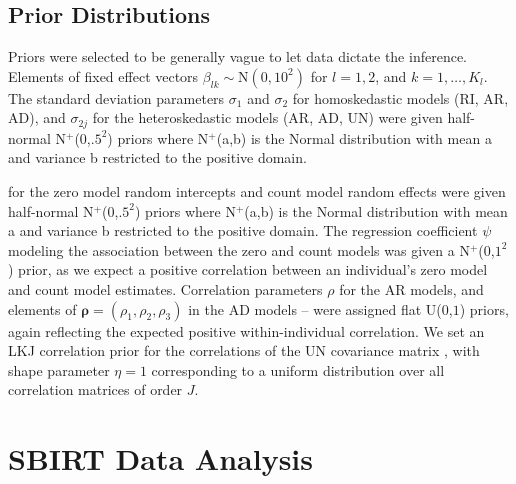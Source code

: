 \documentclass[12pt]{article}
\begin{document}
\subsection{Prior Distributions}

Priors were selected to be generally vague to let data dictate the inference. Elements of fixed effect vectors $\beta_{lk} \sim \text{N}(0, 10^2)$ for $l=1,2$, and $k=1,\dots, K_{l}$. The standard deviation parameters $\sigma_{1}$ and $\sigma_{2}$ for homoskedastic models (RI, AR, AD), and $\sigma_{2j}$ for the heteroskedastic models (AR, AD, UN) were given half-normal N$^+$($0$,$.5^2$) priors where N$^+$(a,b) is the Normal distribution with mean a and variance b restricted to the positive domain.

for the zero model random intercepts and count model random effects were given half-normal N$^+$($0$,$.5^2$) priors where N$^+$(a,b) is the Normal distribution with mean a and variance b restricted to the positive domain. The regression coefficient $\psi$ modeling the association between the zero and count models was given a N$^+$($0$,$1^2$) prior, as we expect a positive correlation between an individual's zero model and count model estimates. Correlation parameters $\rho$ for the AR models, and elements of $\bm{\rho}=(\rho_{1}, \rho_{2}, \rho_{3})$ in the AD models -- were assigned flat U($0$,$1$) priors, again reflecting the expected positive within-individual correlation. We set an LKJ correlation prior \citep{lewandowski2009generating} for the correlations of the UN covariance matrix , with shape parameter $\eta=1$ corresponding to a uniform distribution over all correlation matrices of order $J$.


\section{SBIRT Data Analysis}
\end{document}

